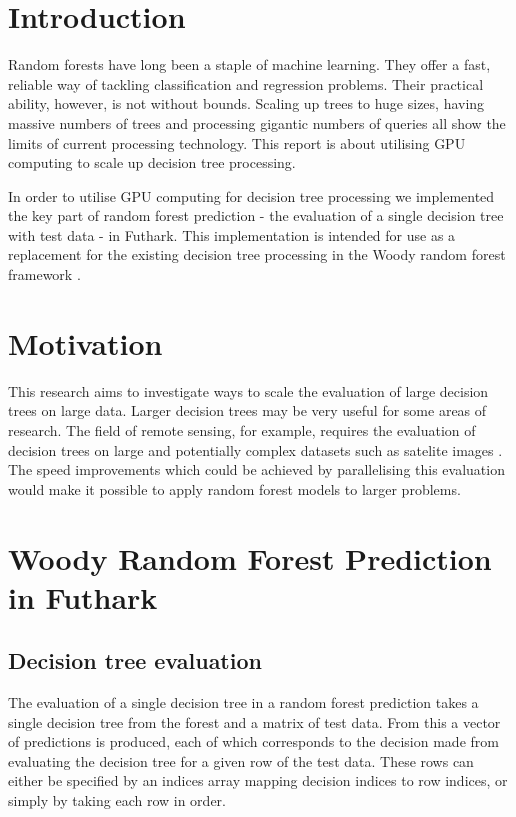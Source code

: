 \documentclass[a4paper]{article}
\begin{document}
\maketitle

\section{Introduction}

Random forests have long been a staple of machine learning. They offer a fast, reliable way of tackling classification and regression problems. Their practical ability, however, is not without bounds. Scaling up trees to huge sizes, having massive numbers of trees and processing gigantic numbers of queries all show the limits of current processing technology. This report is about utilising GPU computing to scale up decision tree processing.

In order to utilise GPU computing for decision tree processing we implemented the key part of random forest prediction - the evaluation of a single decision tree with test data - in Futhark. This implementation is intended for use as a replacement for the existing decision tree processing in the Woody random forest framework \cite{woody}.

\section{Motivation}

This research aims to investigate ways to scale the evaluation of large decision trees on large data. Larger decision trees may be very useful for some areas of research. The field of remote sensing, for example, requires the evaluation of decision trees on large and potentially complex datasets such as satelite images \cite{randomforest}. The speed improvements which could be achieved by parallelising this evaluation would make it possible to apply random forest models to larger problems.

\section{Woody Random Forest Prediction in Futhark}

\subsection{Decision tree evaluation}

The evaluation of a single decision tree in a random forest prediction takes a single decision tree from the forest and a matrix of test data. From this a vector of predictions is produced, each of which corresponds to the decision made from evaluating the decision tree for a given row of the test data. These rows can either be specified by an indices array mapping decision indices to row indices, or simply by taking each row in order.
\end{document}
